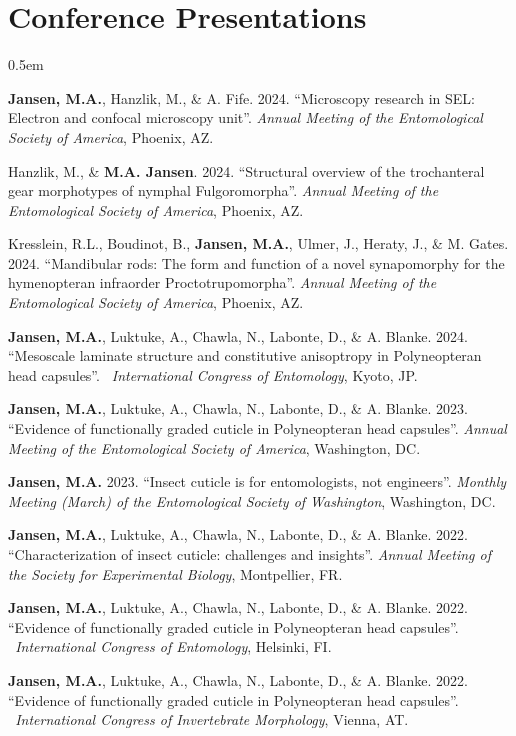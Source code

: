 \documentclass[12pt,a4paper]{article}
\begin{document}
\section*{Conference Presentations}
\begin{description}
	\itemsep0.5em
	\item \textbf{Jansen, M.A.}, Hanzlik, M., \& A. Fife. 2024. ``Microscopy research in SEL: Electron and confocal microscopy unit''. \textit{Annual Meeting of the Entomological Society of America}, Phoenix, AZ.
	\item Hanzlik, M., \& \textbf{M.A. Jansen}. 2024. ``Structural overview of the trochanteral gear morphotypes of nymphal Fulgoromorpha''. \textit{Annual Meeting of the Entomological Society of America}, Phoenix, AZ.
	\item Kresslein, R.L., Boudinot, B., \textbf{Jansen, M.A.}, Ulmer, J., Heraty, J., \& M. Gates. 2024. ``Mandibular rods: The form and function of a novel synapomorphy for the hymenopteran infraorder Proctotrupomorpha''. \textit{Annual Meeting of the Entomological Society of America}, Phoenix, AZ.
	\item \textbf{Jansen, M.A.}, Luktuke, A., Chawla, N., Labonte, D., \& A. Blanke. 2024. ``Mesoscale laminate structure and constitutive anisoptropy in Polyneopteran head capsules''. \textit{~International Congress of Entomology}, Kyoto, JP.
	\item \textbf{Jansen, M.A.}, Luktuke, A., Chawla, N., Labonte, D., \& A. Blanke. 2023. ``Evidence of functionally graded cuticle in Polyneopteran head capsules''. \textit{Annual Meeting of the Entomological Society of America}, Washington, DC.
	\item \textbf{Jansen, M.A.} 2023. ``Insect cuticle is for entomologists, not engineers''. \textit{Monthly Meeting (March) of the Entomological Society of Washington}, Washington, DC.
	\item \textbf{Jansen, M.A.}, Luktuke, A., Chawla, N., Labonte, D., \& A. Blanke. 2022. ``Characterization of insect cuticle: challenges and insights''. \textit{Annual Meeting of the Society for Experimental Biology}, Montpellier, FR.
	\item \textbf{Jansen, M.A.}, Luktuke, A., Chawla, N., Labonte, D., \& A. Blanke. 2022. ``Evidence of functionally graded cuticle	in Polyneopteran head capsules''. \textit{~International Congress of Entomology}, Helsinki, FI.
	\item \textbf{Jansen, M.A.}, Luktuke, A., Chawla, N., Labonte, D., \& A. Blanke. 2022. ``Evidence of functionally graded cuticle	in Polyneopteran head capsules''. \textit{~International Congress of Invertebrate Morphology}, Vienna, AT.

\end{description}
\end{document}
